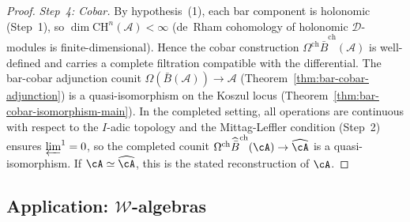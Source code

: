 \begin{proof}
\emph{Step~4: Cobar.}
By hypothesis~(1), each bar component is holonomic
(Step~1), so $\dim \mathrm{CH}^n(\mathcal{A}) < \infty$
(de~Rham cohomology of holonomic $\mathcal{D}$-modules is
finite-dimensional). Hence the cobar construction
$\Omega^{\mathrm{ch}}\widehat{\bar{B}}^{\mathrm{ch}}(\mathcal{A})$
is well-defined and carries a complete filtration compatible with
the differential. The bar-cobar adjunction counit
$\Omega(\bar{B}(\mathcal{A})) \to \mathcal{A}$
(Theorem~\ref{thm:bar-cobar-adjunction}) is a quasi-isomorphism
on the Koszul locus
(Theorem~\ref{thm:bar-cobar-isomorphism-main}).
In the completed setting, all operations are continuous with
respect to the $I$-adic topology and the Mittag-Leffler
condition (Step~2) ensures $\varprojlim^1 = 0$, so the
completed counit
$\Omega^{\mathrm{ch}}\widehat{\bar{B}}^{\mathrm{ch}}(\cA)
\to \widehat{\cA}$ is a quasi-isomorphism. If
$\cA\simeq\widehat{\cA}$, this is the stated reconstruction of
$\cA$.
\end{proof}

\subsection{Application: $\mathcal{W}$-algebras}

